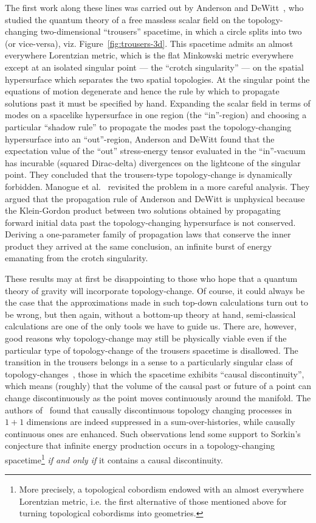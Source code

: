 \documentclass[12pt]{article}
\begin{document}
The first work along these lines was carried out by Anderson and DeWitt~\cite{Anderson:1986ww}, who studied the quantum theory of a free massless scalar field on the topology-changing two-dimensional ``trousers'' spacetime, in which a circle splits into two (or vice-versa), viz. Figure~\ref{fig:trousers-3d}. This spacetime admits an almost everywhere Lorentzian metric, which is the flat Minkowski metric everywhere except at an isolated singular point --- the ``crotch singularity'' --- on the spatial hypersurface which separates the two spatial topologies. At the singular point the equations of motion degenerate and hence the rule by which to propagate solutions past it must be specified by hand. Expanding the scalar field in terms of modes on a spacelike hypersurface in one region (the ``in''-region) and choosing a particular ``shadow rule'' to propagate the modes past the topology-changing hypersurface into an ``out''-region, Anderson and DeWitt found that the expectation value of the ``out'' stress-energy tensor evaluated in the ``in''-vacuum has incurable (squared Dirac-delta) divergences on the lightcone of the singular point. They concluded that the trousers-type topology-change is dynamically forbidden. Manogue et al.~\cite{Copeland:1988tr} revisited the problem in a more careful analysis. They argued that the propagation rule of Anderson and DeWitt is unphysical because the Klein-Gordon product between two solutions obtained by propagating forward initial data past the topology-changing hypersurface is not conserved. Deriving a one-parameter family of propagation laws that conserve the inner product they arrived at the same conclusion, an infinite burst of energy emanating from the crotch singularity.

These results may at first be disappointing to those who hope that a quantum theory of gravity will incorporate topology-change. Of course, it could always be the case that the approximations made in such top-down calculations turn out to be wrong, but then again, without a bottom-up theory at hand, semi-classical calculations are one of the only tools we have to guide us. There are, however, good reasons why topology-change may still be physically viable even if the particular type of topology-change of the trousers spacetime is disallowed. The transition in the trousers belongs in a sense to a particularly singular class of topology-changes~\cite{Dowker:1997hj}, those in which the spacetime exhibits ``causal discontinuity'', which means (roughly) that the volume of the causal past or future of a point can change discontinuously as the point moves continuously around the manifold. The authors of~\cite{Louko:1995jw} found that causally discontinuous topology changing processes in $1+1$ dimensions are indeed suppressed in a sum-over-histories, while causally continuous ones are enhanced. Such observations lend some support to Sorkin's conjecture that infinite energy production occurs in a topology-changing spacetime\footnote{More precisely, a topological cobordism endowed with an almost everywhere Lorentzian metric, i.e. the first alternative of those mentioned above for turning topological cobordisms into geometries.} \emph{if and only if} it contains a causal discontinuity.
\end{document}
